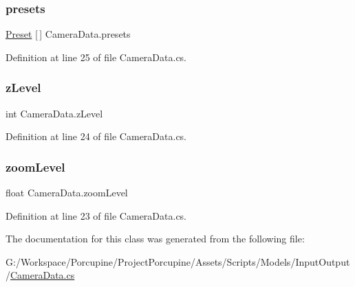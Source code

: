 \subsubsection{\texorpdfstring{presets}{presets}}
{\footnotesize\ttfamily \hyperlink{struct_preset}{Preset} \mbox{[}$\,$\mbox{]} Camera\+Data.\+presets}



Definition at line 25 of file Camera\+Data.\+cs.

\mbox{\label{class_camera_data_aa41bab97e035b11732452f0b2b19f0d4}} 
\subsubsection{\texorpdfstring{z\+Level}{zLevel}}
{\footnotesize\ttfamily int Camera\+Data.\+z\+Level}



Definition at line 24 of file Camera\+Data.\+cs.

\mbox{\label{class_camera_data_a7045f0bec85d0a84c6bc72bfdfafedb8}} 
\subsubsection{\texorpdfstring{zoom\+Level}{zoomLevel}}
{\footnotesize\ttfamily float Camera\+Data.\+zoom\+Level}



Definition at line 23 of file Camera\+Data.\+cs.



The documentation for this class was generated from the following file\+:\begin{DoxyCompactItemize}
\item 
G\+:/\+Workspace/\+Porcupine/\+Project\+Porcupine/\+Assets/\+Scripts/\+Models/\+Input\+Output/\hyperlink{_camera_data_8cs}{Camera\+Data.\+cs}\end{DoxyCompactItemize}
